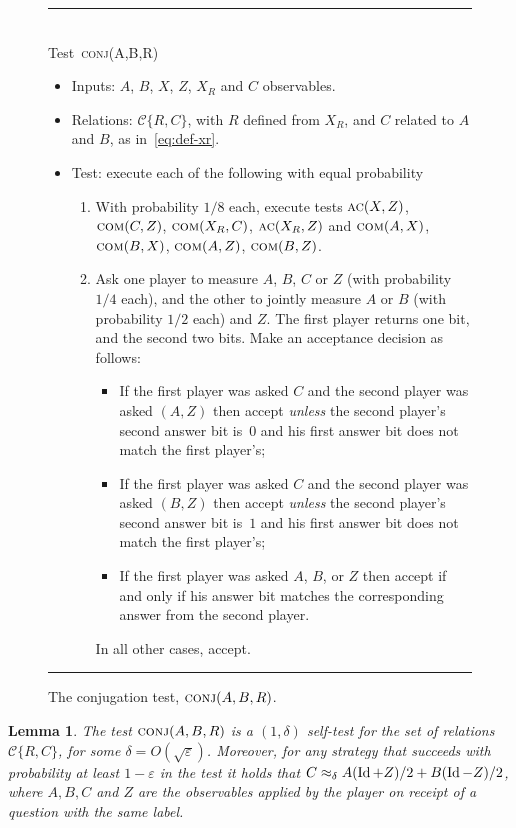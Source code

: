 \documentclass[11pt]{article}
\numberwithin{equation}{section}
\newtheorem{lemma}[theorem]{Lemma}
\theoremstyle{definition}
\theoremstyle{plain}
\newcommand{\Id}{\ensuremath{\mathop{\rm Id}\nolimits}}
\newcommand{\eps}{\varepsilon}
\newcommand{\conj}{\textsc{conj}}
\newcommand{\comt}{\textsc{com}}
\newcommand{\act}{\textsc{ac}}
\begin{document}
%
%

\begin{figure}[H]
\rule[1ex]{\textwidth}{0.5pt}\\
Test~\conj(A,B,R) 
\begin{itemize}
\setlength\itemsep{-0.25em}   %
    \item Inputs: $A$, $B$, $X$, $Z$, $X_R$ and $C$ observables.
    \item Relations:  $\mathcal{C}\{R,C\} $, with $R$ defined from $X_R$, and $C$ related to $A$ and $B$, as in~\eqref{eq:def-xr}. 
    \item Test: execute each of the following with equal probability
      \begin{enumerate}
\setlength\itemsep{-0.17em}   %
\item[(a)] With probability $1/8$ each, execute tests $\act(X,Z)$,  $\comt(C,Z)$, $\comt(X_R,C)$,   $\act(X_R,Z)$ and $\comt(A,X)$, $\comt(B,X)$, $\comt(A,Z)$, $\comt(B,Z)$. 
\item[(b)] Ask one player to measure $A$, $B$, $C$ or $Z$ (with probability $1/4$ each), and the other to jointly measure $A$ or $B$ (with probability $1/2$ each) and $Z$. The first player returns one bit, and the second two bits. Make an acceptance decision as follows: 
\begin{itemize}
\item If the first player was asked $C$ and the second player was asked $(A,Z)$ then accept \emph{unless} the second player's second answer bit is~$0$ and his first answer bit does not match the first player's;
\item If the first player was asked $C$ and the second player was asked $(B,Z)$ then accept \emph{unless} the second player's second answer bit is~$1$ and his first answer bit does not match the first player's;
\item If the first player was asked $A$, $B$, or $Z$ then accept if and only if his answer bit matches the corresponding answer from the second player.
\end{itemize}
In all other cases, accept. 
\end{enumerate}
\end{itemize}
\rule[2ex]{\textwidth}{0.5pt}\vspace{-0.5cm}
\caption{The conjugation test, $\conj(A,B,R)$.}
\label{fig:conjugation-test-1}
\end{figure}

\begin{lemma}\label{lem:conj}
The test $\conj(A,B,R)$ is a $(1,\delta)$ self-test for the set of relations
  $\mathcal{C}\{R,C\}$, for some $\delta = O(\sqrt{\eps})$. Moreover, for any
  strategy that succeeds with probability at least $1-\eps$ in the test it holds
  that $C \approx_{\delta} A  (\Id+Z)/2 + B
 (\Id-Z)/2$, where $A,B,C$ and $Z$ are the observables applied by the player on receipt of a question with the same label. 
\end{lemma}
\end{document}
